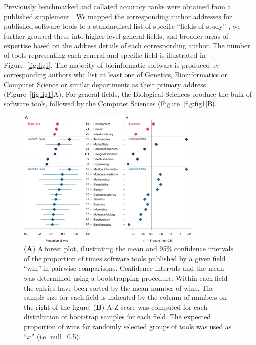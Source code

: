 \documentclass[fleqn,10pt,doc,onecolumn]{SelfArx}%
\begin{document}
Previously benchmarked and collated accuracy ranks were obtained from
a published supplement \cite{gardner2024}. We mapped the corresponding
author addresses for published software tools to a standardised list of
specific ``fields of study'' \cite{fields2014}, we further grouped
these into higher level general fields, and broader areas of expertise
based on the address details of each corresponding author. The number
of tools representing each general and specific field is illustrated
in Figure~\ref{fig:fig1}. The majority of bioinformatic
software is produced by corresponding authors who list at least one of
Genetics, Bioinformatics or Computer Science or similar departments as
their primary address (Figure~\ref{fig:fig1}A). For general fields, the
Biological Sciences produce the bulk of software tools, followed by
the Computer Sciences (Figure~\ref{fig:fig1}B).

\begin{figure}[ht!]
\begin{center}
  \includegraphics[width=0.8\textwidth]{forest-z-Plot.pdf}
\end{center}
\caption{(\textbf{A}) A forest plot, illustrating the mean and 95\%
  confidence intervals of the proportion of times software tools
  published by a given field ``win'' in pairwise
  comparisons. Confidence intervals and the mean was determined using
  a bootstrapping procedure. Within each field the entries have been
  sorted by the mean number of wins. The sample size for each field is
  indicated by the column of numbers on the right of the figure.
  (\textbf{B}) A Z-score was computed for each distribution of
  bootstrap samples for each field. The expected proportion of wins
  for randomly selected groups of tools was used as ``$x$''
  (i.e. null=0.5).   }
\label{fig:fig2}
\end{figure}
\end{document}
